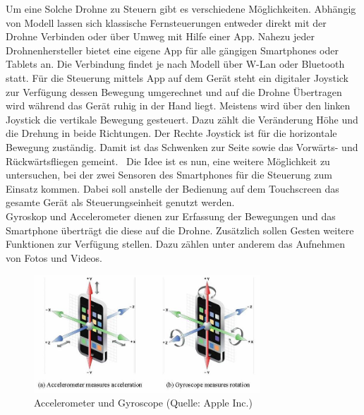 \documentclass{article}
\begin{document}
Um eine Solche Drohne zu Steuern gibt es verschiedene Möglichkeiten. Abhängig von Modell lassen sich klassische Fernsteuerungen entweder direkt mit der Drohne Verbinden oder über Umweg mit Hilfe einer App. Nahezu jeder Drohnenhersteller bietet eine eigene App für alle gängigen Smartphones oder Tablets an. Die Verbindung findet je nach Modell über W-Lan oder Bluetooth statt. Für die Steuerung mittels App auf dem Gerät steht ein digitaler Joystick zur Verfügung dessen Bewegung umgerechnet und auf die Drohne Übertragen wird während das Gerät ruhig in der Hand liegt. Meistens wird über den linken Joystick die vertikale Bewegung gesteuert. Dazu zählt die Veränderung Höhe und die Drehung in beide Richtungen. Der Rechte Joystick ist für die horizontale Bewegung zuständig. Damit ist das Schwenken zur Seite sowie das Vorwärts- und Rückwärtsfliegen gemeint. 
\ Die Idee ist es nun, eine weitere Möglichkeit zu untersuchen, bei der zwei Sensoren des Smartphones für die Steuerung zum Einsatz kommen. Dabei soll anstelle der Bedienung auf dem Touchscreen das gesamte Gerät als Steuerungseinheit genutzt werden. \\Gyroskop und Accelerometer dienen zur Erfassung der Bewegungen und das Smartphone überträgt die diese auf die Drohne. Zusätzlich sollen Gesten weitere Funktionen zur Verfügung stellen. Dazu zählen unter anderem das Aufnehmen von Fotos und Videos.
\begin{figure}[htb]
\begin{minipage}[b]{1.0\linewidth}
  \centering
\centerline{\includegraphics[width= 85mm]{gyro.jpg}}
\end{minipage}
\caption{Accelerometer und Gyroscope (Quelle: Apple Inc.)}
\label{fig:gyro}
\end{figure}
\end{document}
